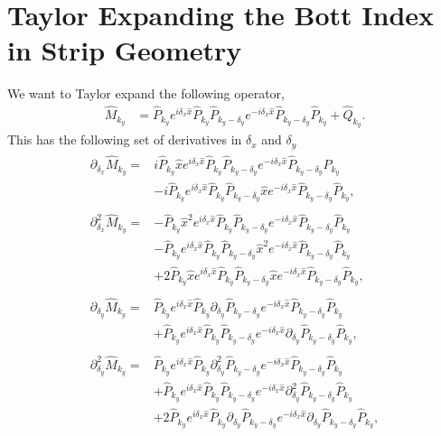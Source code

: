 \section{Taylor Expanding the Bott Index in Strip Geometry}\label{sec:bott_derivatives}
We want to Taylor expand the following operator,
\begin{align}
	\hat M_{k_y} &= \hat P_{k_y}  e^{i \delta_x \hat x}  \hat P_{k_y} \hat P_{k_y - \delta_y} e^{-i \delta_x \hat x}  \hat P_{k_y - \delta_y} \hat P_{k_y} + \hat Q_{k_y}.
\end{align}
This has the following set of derivatives in $\delta_x$ and $\delta_y$
\begin{align}
	\begin{split}
		\partial_{\delta_x} \hat M_{k_y} = 
		& i \hat P_{k_y} \hat x  e^{i \delta_x \hat x}  \hat P_{k_y} \hat P_{k_y - \delta_y} e^{-i \delta_x \hat x}  \hat P_{k_y - \delta_y} \hat P_{k_y} \\
		&-  i \hat P_{k_y}   e^{i \delta_x \hat x}  \hat P_{k_y} \hat P_{k_y - \delta_y} \hat x e^{-i \delta_x \hat x}  \hat P_{k_y - \delta_y} \hat P_{k_y},
	\end{split}\\
	\begin{split}
		\partial_{\delta_x}^2 \hat M_{k_y} = 
		& - \hat P_{k_y} \hat x^2  e^{i \delta_x \hat x}  \hat P_{k_y} \hat P_{k_y - \delta_y} e^{-i \delta_x \hat x}  \hat P_{k_y - \delta_y} \hat P_{k_y} \\
		&-   \hat P_{k_y}   e^{i \delta_x \hat x}  \hat P_{k_y} \hat P_{k_y - \delta_y} \hat x^2 e^{-i \delta_x \hat x}  \hat P_{k_y - \delta_y} \hat P_{k_y}\\
		&+ 2\hat P_{k_y} \hat x  e^{i \delta_x \hat x}  \hat P_{k_y} \hat P_{k_y - \delta_y} \hat x e^{-i \delta_x \hat x}  \hat P_{k_y - \delta_y} \hat P_{k_y} ,
	\end{split}\\
	\begin{split}
		\partial_{\delta_y} \hat M_{k_y} = 
		&  \hat P_{k_y} e^{i \delta_x \hat x}  \hat P_{k_y} \partial_{\delta_y} \hat P_{k_y - \delta_y} e^{-i \delta_x \hat x}  \hat P_{k_y - \delta_y} \hat P_{k_y}\\
		&+  \hat P_{k_y} e^{i \delta_x \hat x}  \hat P_{k_y}\hat P_{k_y - \delta_y} e^{-i \delta_x \hat x}  \partial_{\delta_y}  \hat P_{k_y - \delta_y} \hat P_{k_y},
	\end{split}\\
	\begin{split}
		\partial_{\delta_y}^2 \hat M_{k_y} = 
		&  \hat P_{k_y} e^{i \delta_x \hat x}  \hat P_{k_y} \partial_{\delta_y}^2 \hat P_{k_y - \delta_y} e^{-i \delta_x \hat x}  \hat P_{k_y - \delta_y} \hat P_{k_y}\\
		&+  \hat P_{k_y} e^{i \delta_x \hat x}  \hat P_{k_y}\hat P_{k_y - \delta_y} e^{-i \delta_x \hat x}  \partial_{\delta_y}^2  \hat P_{k_y - \delta_y} \hat P_{k_y}\\
		&+2  \hat P_{k_y} e^{i \delta_x \hat x}  \hat P_{k_y} \partial_{\delta_y} \hat P_{k_y - \delta_y} e^{-i \delta_x \hat x}  \partial_{\delta_y}  \hat P_{k_y - \delta_y} \hat P_{k_y},
	\end{split}
\end{align}
